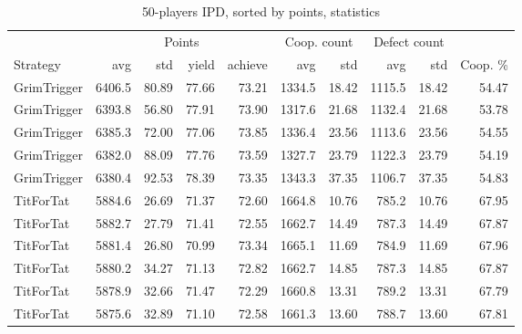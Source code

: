 \documentclass[journal,10pt,twoside]{IEEEtran}
\begin{document}
\begin{table}[ht]
    \caption{50-players IPD, sorted by points, statistics}
    \label{tab:ipdmp50}
    \centering
    \begin{tabular}{l|rrrr|rrrrr} \toprule
                          &     \multicolumn{4}{c}{Points}     & \multicolumn{2}{c}{Coop. count} & \multicolumn{2}{c}{Defect count} &          \\
        Strategy          &    avg &    std &  yield & achieve &    avg &                    std &    avg &                     std & Coop. \% \\ \midrule
        GrimTrigger       & 6406.5 &  80.89 &  77.66 &   73.21 & 1334.5 &                  18.42 & 1115.5 &                   18.42 &    54.47 \\
        GrimTrigger       & 6393.8 &  56.80 &  77.91 &   73.90 & 1317.6 &                  21.68 & 1132.4 &                   21.68 &    53.78 \\
        GrimTrigger       & 6385.3 &  72.00 &  77.06 &   73.85 & 1336.4 &                  23.56 & 1113.6 &                   23.56 &    54.55 \\
        GrimTrigger       & 6382.0 &  88.09 &  77.76 &   73.59 & 1327.7 &                  23.79 & 1122.3 &                   23.79 &    54.19 \\
        GrimTrigger       & 6380.4 &  92.53 &  78.39 &   73.35 & 1343.3 &                  37.35 & 1106.7 &                   37.35 &    54.83 \\
        TitForTat         & 5884.6 &  26.69 &  71.37 &   72.60 & 1664.8 &                  10.76 &  785.2 &                   10.76 &    67.95 \\
        TitForTat         & 5882.7 &  27.79 &  71.41 &   72.55 & 1662.7 &                  14.49 &  787.3 &                   14.49 &    67.87 \\
        TitForTat         & 5881.4 &  26.80 &  70.99 &   73.34 & 1665.1 &                  11.69 &  784.9 &                   11.69 &    67.96 \\
        TitForTat         & 5880.2 &  34.27 &  71.13 &   72.82 & 1662.7 &                  14.85 &  787.3 &                   14.85 &    67.87 \\
        TitForTat         & 5878.9 &  32.66 &  71.47 &   72.29 & 1660.8 &                  13.31 &  789.2 &                   13.31 &    67.79 \\
        TitForTat         & 5875.6 &  32.89 &  71.10 &   72.58 & 1661.3 &                  13.60 &  788.7 &                   13.60 &    67.81 \\

\end{tabular}
\end{table}
\end{document}
